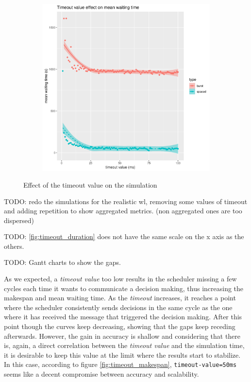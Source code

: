 \begin{figure}
	\centering
	\begin{subfigure}{.5\textwidth}
		\centering
		\includegraphics[width=\linewidth]{imgs/timeout_mwt.png}
		\caption{}
		\label{fig:timeout_mwt}
	\end{subfigure}
	\caption{Effect of the timeout value on the simulation}
	\label{fig:timeout}
\end{figure}

TODO: redo the simulations for the realistic wl, removing some values of
timeout and adding repetition to show aggregated metrics. (non aggregated ones
are too dispersed)

TODO: \ref{fig:timeout_duration} does not have the same scale on the x axis as the others.

TODO: Gantt charts to show the gaps.

As we expected, a \textit{timeout value} too low results in the scheduler
missing a few cycles each time it wants to communicate a decision making, thus
increasing the makespan and mean waiting time.  As the \textit{timeout}
increases, it reaches a point where the scheduler consistently sends decisions
in the same cycle as the one where it has received the message that triggered
the decision making. After this point though the curves keep decreasing,
showing that the gaps keep receding afterwards. However, the gain in accuracy
is shallow and considering that there is, again, a direct correlation between
the \textit{timeout value} and the simulation time, it is desirable to keep
this value at the limit where the results start to stabilize.  In this case,
according to figure \ref{fig:timeout_makespan}, \texttt{timeout-value=50ms}
seems like a decent compromise between accuracy and scalability.

